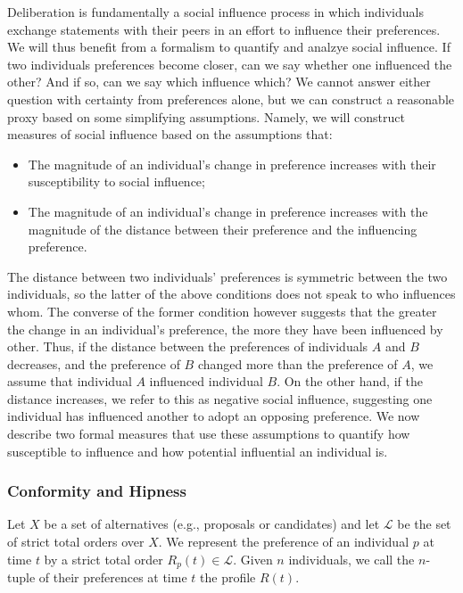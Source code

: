 Deliberation is fundamentally a social influence process in which
individuals exchange statements with their peers in an effort to influence their preferences.
We will thus benefit from a formalism to quantify and analzye social influence.
If two individuals preferences become closer, can we say whether one influenced the other? And if so, can we say which influence which?
We cannot answer either question with certainty from preferences alone, but we can construct a reasonable proxy based on some simplifying assumptions.
Namely, we will construct measures of social influence based on the assumptions that:
\begin{itemize}
    \item The magnitude of an individual's change in preference increases with their susceptibility to social influence;
    \item The magnitude of an individual's change in preference increases with the magnitude of the distance between their preference and the influencing preference.
\end{itemize}
The distance between two individuals' preferences is symmetric between the two individuals,
so the latter of the above conditions does not speak to who influences whom.
The converse of the former condition however suggests that the greater the change in an individual's preference,
the more they have been influenced by other.
Thus, if the distance between the preferences of individuals $A$ and $B$ decreases, and the preference of $B$ changed more than the preference of $A$, we assume that individual $A$ influenced individual $B$.
On the other hand, if the distance increases, we refer to this as negative social influence, suggesting one individual has influenced another to adopt an opposing preference.
We now describe two formal measures that use these assumptions to quantify how susceptible to influence and how potential influential an individual is.

\subsubsection{Conformity and Hipness}

Let $X$ be a set of alternatives (e.g., proposals or candidates)
and let $\mathcal{L}$ be the set of strict total orders over $X$.
We represent the preference of an individual $p$ at time $t$
by a strict total order $R_p(t) \in \mathcal{L}$.
Given $n$ individuals, we call the $n$-tuple of their preferences
at time $t$ the profile $R(t)$.

